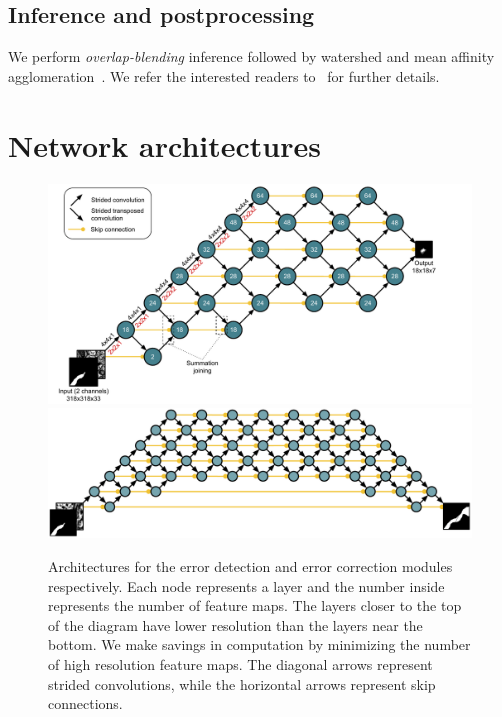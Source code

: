\documentclass{article}
\begin{document}
\begin{appendices}
\subsection{Inference and postprocessing}
We perform \emph{overlap-blending} inference followed by watershed and mean affinity agglomeration~\cite{kisuk}. We refer the interested readers to~\cite{kisuk} for further details.

\section{Network architectures}
\label{appendix:architecture}

\begin{figure}
\centering
\includegraphics[width=1.0\linewidth]{detector.pdf}
\centering
\includegraphics[width=1.0\linewidth]{corrector2.pdf}

\caption{Architectures for the error detection and error correction modules respectively. Each node represents a layer and the number inside represents the number of feature maps. The layers closer to the top of the diagram have lower resolution than the layers near the bottom. We make savings in computation by minimizing the number of high resolution feature maps. The diagonal arrows represent strided convolutions, while the horizontal arrows represent skip connections.}
\label{fig:architecture}
\end{figure}


\end{appendices}
\end{document}
